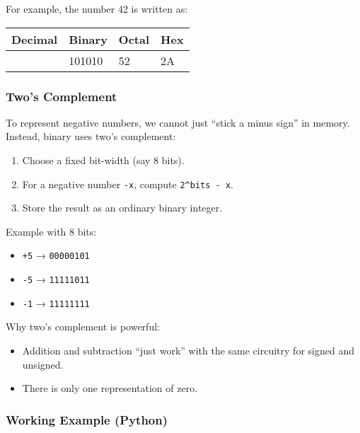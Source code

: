 \documentclass[
  letterpaper,
  DIV=11,
  numbers=noendperiod]{scrreprt}
\providecommand{\tightlist}{%
  \setlength{\itemsep}{0pt}\setlength{\parskip}{0pt}}
\begin{document}
For example, the number 42 is written as:

\begin{longtable}[]{@{}llll@{}}
\toprule\noalign{}
Decimal & Binary & Octal & Hex \\
\midrule\noalign{}
\endhead
\bottomrule\noalign{}
\endlastfoot
42 & 101010 & 52 & 2A \\
\end{longtable}

\subsubsection{Two's Complement}\label{twos-complement}

To represent negative numbers, we cannot just ``stick a minus sign'' in
memory. Instead, binary uses two's complement:

\begin{enumerate}
\def\labelenumi{\arabic{enumi}.}
\tightlist
\item
  Choose a fixed bit-width (say 8 bits).
\item
  For a negative number \texttt{-x}, compute \texttt{2\^{}bits\ -\ x}.
\item
  Store the result as an ordinary binary integer.
\end{enumerate}

Example with 8 bits:

\begin{itemize}
\tightlist
\item
  \texttt{+5} → \texttt{00000101}
\item
  \texttt{-5} → \texttt{11111011}
\item
  \texttt{-1} → \texttt{11111111}
\end{itemize}

Why two's complement is powerful:

\begin{itemize}
\tightlist
\item
  Addition and subtraction ``just work'' with the same circuitry for
  signed and unsigned.
\item
  There is only one representation of zero.
\end{itemize}

\subsubsection{Working Example (Python)}\label{working-example-python}
\end{document}
